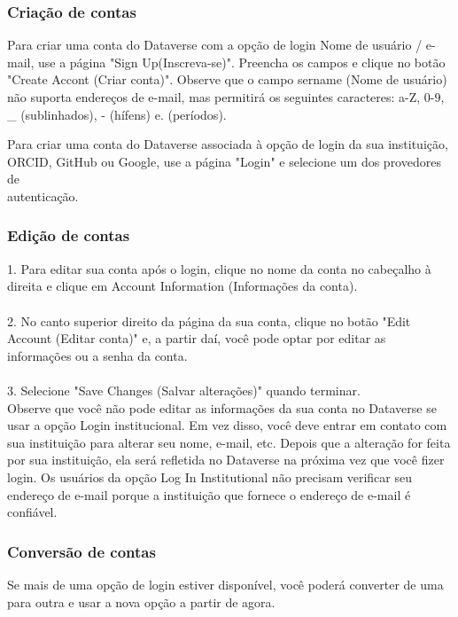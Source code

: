 \documentclass[12pt,hidelinks]{article}
\begin{document}
        \subsubsection{Criação de contas}
        
\qquad Para criar uma conta do Dataverse com a opção de login Nome de usuário / e-mail, use a página "Sign Up(Inscreva-se)". Preencha os campos e clique no botão "Create Accont (Criar conta)". Observe que o campo sername (Nome de usuário) não suporta endereços de e-mail, mas permitirá os seguintes caracteres: a-Z, 0-9, \_ (sublinhados), - (hífens) e. (períodos).

Para criar uma conta do Dataverse associada à opção de login da sua instituição, ORCID, GitHub ou Google, use a página "Login" e selecione um dos provedores de \\autenticação.

        \subsubsection{Edição de contas}
        
1. Para editar sua conta após o login, clique no nome da conta no cabeçalho à direita e clique em Account Information (Informações da conta).\\\\
2. No canto superior direito da página da sua conta, clique no botão "Edit Account (Editar conta)" e, a partir daí, você pode optar por editar as informações ou a senha da conta.\\\\
3. Selecione "Save Changes (Salvar alterações)" quando terminar.\\

Observe que você não pode editar as informações da sua conta no Dataverse se usar a opção Login institucional. Em vez disso, você deve entrar em contato com sua instituição para alterar seu nome, e-mail, etc. Depois que a alteração for feita por sua instituição, ela será refletida no Dataverse na próxima vez que você fizer login. Os usuários da opção Log In Institutional  não precisam verificar seu endereço de e-mail porque a instituição que fornece o endereço de e-mail é confiável.
        
        \subsubsection{Conversão de contas}
        
        
\qquad Se mais de uma opção de login estiver disponível, você poderá converter de uma para outra e usar a nova opção a partir de agora.
\end{document}
